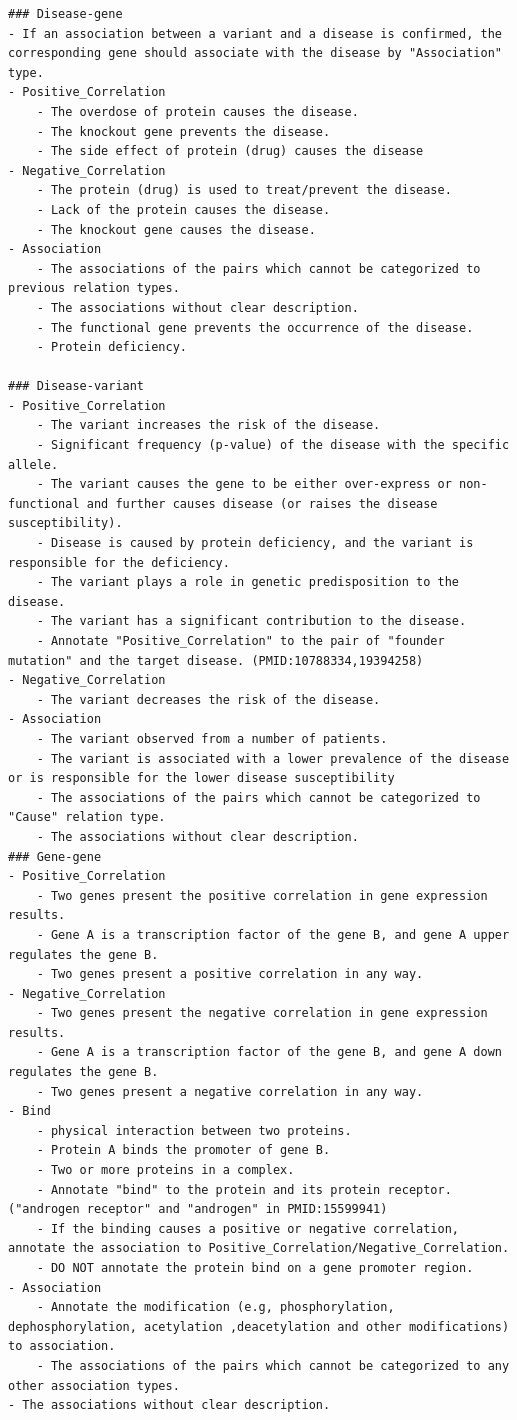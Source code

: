 \begin{lstlisting}
### Disease-gene
- If an association between a variant and a disease is confirmed, the corresponding gene should associate with the disease by "Association" type.
- Positive_Correlation
    - The overdose of protein causes the disease.
    - The knockout gene prevents the disease.
    - The side effect of protein (drug) causes the disease
- Negative_Correlation
    - The protein (drug) is used to treat/prevent the disease.
    - Lack of the protein causes the disease.
    - The knockout gene causes the disease.
- Association
    - The associations of the pairs which cannot be categorized to previous relation types.
    - The associations without clear description.
    - The functional gene prevents the occurrence of the disease.
    - Protein deficiency.

### Disease-variant
- Positive_Correlation
    - The variant increases the risk of the disease.
    - Significant frequency (p-value) of the disease with the specific allele.
    - The variant causes the gene to be either over-express or non-functional and further causes disease (or raises the disease susceptibility).
    - Disease is caused by protein deficiency, and the variant is responsible for the deficiency.
    - The variant plays a role in genetic predisposition to the disease.
    - The variant has a significant contribution to the disease.
    - Annotate "Positive_Correlation" to the pair of "founder mutation" and the target disease. (PMID:10788334,19394258)
- Negative_Correlation
    - The variant decreases the risk of the disease.
- Association
    - The variant observed from a number of patients.
    - The variant is associated with a lower prevalence of the disease or is responsible for the lower disease susceptibility
    - The associations of the pairs which cannot be categorized to "Cause" relation type.
    - The associations without clear description.
### Gene-gene
- Positive_Correlation
    - Two genes present the positive correlation in gene expression results.
    - Gene A is a transcription factor of the gene B, and gene A upper regulates the gene B.
    - Two genes present a positive correlation in any way.
- Negative_Correlation
    - Two genes present the negative correlation in gene expression results.
    - Gene A is a transcription factor of the gene B, and gene A down regulates the gene B.
    - Two genes present a negative correlation in any way.
- Bind
    - physical interaction between two proteins.
    - Protein A binds the promoter of gene B.
    - Two or more proteins in a complex.
    - Annotate "bind" to the protein and its protein receptor. ("androgen receptor" and "androgen" in PMID:15599941)
    - If the binding causes a positive or negative correlation, annotate the association to Positive_Correlation/Negative_Correlation.
    - DO NOT annotate the protein bind on a gene promoter region.
- Association
    - Annotate the modification (e.g, phosphorylation, dephosphorylation, acetylation ,deacetylation and other modifications) to association.
    - The associations of the pairs which cannot be categorized to any other association types.
- The associations without clear description.


\end{lstlisting}
